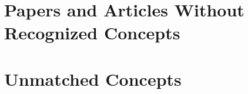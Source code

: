 \documentclass[a4paper]{article}
\newcommand{\su}[1]{\Shortunderstack[l]{#1}}
\begin{document}




\clearpage
\section{Papers and Articles Without Recognized Concepts}





\clearpage
\section{Unmatched Concepts}




\end{document}
